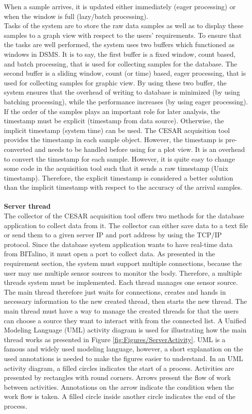 When a sample arrives, it is updated either immediately (eager processing) or when the window is full (lazy/batch processing).\\
Tasks of the system are to store the raw data samples as well as to display these samples to a graph view with respect to the users’ requirements. To ensure that the tasks are well performed, the system uses two buffers which functioned as windows in DSMS. It is to say, the first buffer is a fixed window, count based, and batch processing, that is used for collecting samples for the database. The second buffer is a sliding window, count (or time) based, eager processing, that is used for collecting samples for graphic view. By using these two buffer, the system ensures that the overhead of writing to database is minimized (by using batching processing), while the performance increases (by using eager processing).\\
If the order of the samples plays an important role for later analysis, the timestamp must be explicit (timestamp from data source). Otherwise, the implicit timestamp (system time) can be used. The CESAR acquisition tool provides the timestamp in each sample object. However, the timestamp is pre-converted and needs to be handled before using for a plot view. It is an overhead to convert the timestamp for each sample. However, it is quite easy to change some code in the acquisition tool such that it sends a raw timestamp (Unix timestamp). Therefore, the explicit timestamp is considered a better solution than the implicit timestamp with respect to the accuracy of the arrival samples.\\\\
\textbf{Server thread}\\
The collector of the CESAR acquisition tool offers two methods for the database application to collect data from it. The collector can either save data to a text file or send them to a given server IP and port address by using the TCP/IP protocol. Since the database system application wants to have real-time data from BITalino, it must open a port to collect data. As presented in the requirement section, the system must support multiple connections, because the user may use multiple sensor sources to monitor the body. Therefore, a multiple threads system must be implemented. Each thread manages one sensor source. The main thread therefore just waits for connections, creates and hands in necessary information to the new created thread, then starts the new thread. The main thread must have a way to manage the created threads for that the users can choose a source they want to interact with from the connected list. A Unified Modeling Language (UML) activity diagram is used for illustrating how the main thread works as presented in Figure \ref{fig:Figures/ServerActivity}. UML is a famous and widely used modeling language, however, a short explanation on the used annotations is needed to make the figures easier to understand. In an UML activity diagram, a filled circles indicates the start of a process. Activities are presented by rectangles with round corners. Arrows present the flow of work between activities. Annotations on the arrow indicate the condition when the work flow is taken. A filled circle inside another circle indicates the end of the process.\\
